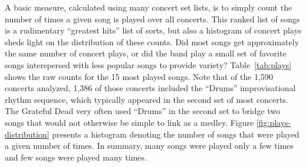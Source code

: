 \documentclass{svmult}
\newcommand{\ttt}[1]{``#1''}
\begin{document}
A basic measure, calculated using many concert set lists, is to simply count the number of times a given song is played over all concerts.  This ranked list of songs is a rudimentary ``greatest hits'' list of sorts, but also a histogram of concert plays sheds light on the distribution of these counts.  Did most songs get approximately the same number of concert plays, or did the band play a small set of favorite songs interspersed with less popular songs to provide variety? Table~\ref{tab:plays} shows the raw counts for the 15 most played songs.  Note that of the 1,590 concerts analyzed, 1,386 of those concerts included the \ttt{Drums} improvisational rhythm sequence, which typically appeared in the second set of most concerts.  The Grateful Dead very often used \ttt{Drums} in the second set to bridge two songs that would not otherwise be simple to link as a medley.  Figure \ref{fig:plays-distribution} presents a histogram denoting the number of songs that were played a given number of times. In summary, many songs were played only a few times and few songs were played many times.
\end{document}

